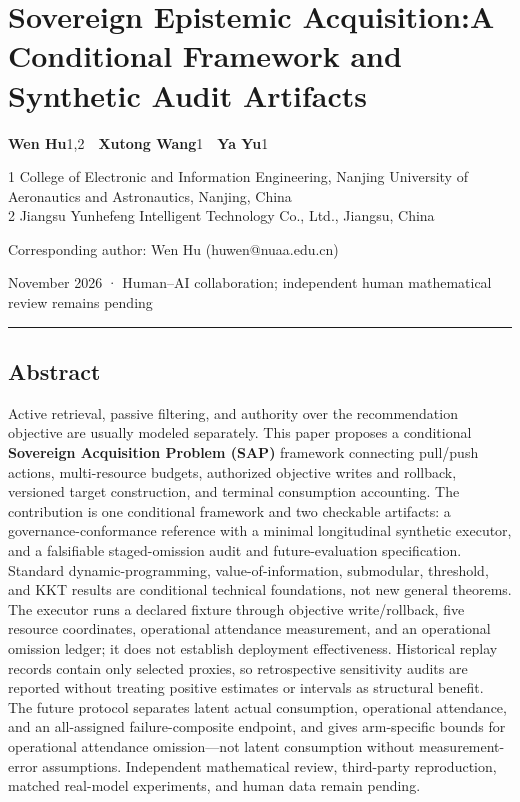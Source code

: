 \documentclass[
  11pt]{article}
\author{}
\date{22 November 2026}
\begin{document}
\section{\texorpdfstring{Sovereign Epistemic Acquisition:\newline A
Conditional Framework and Synthetic Audit
Artifacts}{Sovereign Epistemic Acquisition:A Conditional Framework and Synthetic Audit Artifacts}}\label{sovereign-epistemic-acquisitiona-conditional-framework-and-synthetic-audit-artifacts}

\textbf{Wen Hu}1,2~~\textbf{Xutong Wang}1~~\textbf{Ya Yu}1

1 College of Electronic and Information Engineering, Nanjing University
of Aeronautics and Astronautics, Nanjing, China\\
2 Jiangsu Yunhefeng Intelligent Technology Co., Ltd., Jiangsu, China

Corresponding author: Wen Hu (huwen@nuaa.edu.cn)

November 2026 · Human--AI collaboration; independent human mathematical
review remains pending

\begin{center}\rule{0.5\linewidth}{0.5pt}\end{center}

\subsection{Abstract}\label{abstract}

Active retrieval, passive filtering, and authority over the
recommendation objective are usually modeled separately. This paper
proposes a conditional \textbf{Sovereign Acquisition Problem (SAP)}
framework connecting pull/push actions, multi-resource budgets,
authorized objective writes and rollback, versioned target construction,
and terminal consumption accounting. The contribution is one conditional
framework and two checkable artifacts: a governance-conformance
reference with a minimal longitudinal synthetic executor, and a
falsifiable staged-omission audit and future-evaluation specification.
Standard dynamic-programming, value-of-information, submodular,
threshold, and KKT results are conditional technical foundations, not
new general theorems. The executor runs a declared fixture through
objective write/rollback, five resource coordinates, operational
attendance measurement, and an operational omission ledger; it does not
establish deployment effectiveness. Historical replay records contain
only selected proxies, so retrospective sensitivity audits are reported
without treating positive estimates or intervals as structural benefit.
The future protocol separates latent actual consumption, operational
attendance, and an all-assigned failure-composite endpoint, and gives
arm-specific bounds for operational attendance omission---not latent
consumption without measurement-error assumptions. Independent
mathematical review, third-party reproduction, matched real-model
experiments, and human data remain pending.
\end{document}
